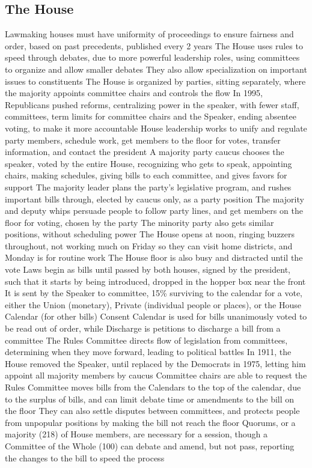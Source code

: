 \documentclass[11 pt, twoside]{article}
\newenvironment{outline*}
{
	\begin{outline}[enumerate]
	}
	{\end{outline}
}
\begin{document}
\subsection{The House}
\begin{outline*}
\1 Lawmaking houses must have uniformity of proceedings to ensure fairness and order, based on past precedents, published every 2 years
\1 The House uses rules to speed through debates, due to more powerful leadership roles, using committees to organize and allow smaller debates
\2 They also allow specialization on important issues to constituents
\2 The House is organized by parties, sitting separately, where the majority appoints committee chairs and controls the flow
\2 In 1995, Republicans pushed reforms, centralizing power in the speaker, with fewer staff, committees, term limits for committee chairs and the Speaker, ending absentee voting, to make it more accountable
\1 House leadership works to unify and regulate party members, schedule work, get members to the floor for votes, transfer information, and contact the president
\2 A majority party caucus chooses the speaker, voted by the entire House, recognizing who gets to speak, appointing chairs, making schedules, giving bills to each committee, and gives favors for support
\2 The majority leader plans the party's legislative program, and rushes important bills through, elected by caucus only, as a party position
\2 The majority and deputy whips persuade people to follow party lines, and get members on the floor for voting, chosen by the party
\2 The minority party also gets similar positions, without scheduling power
\1 The House opens at noon, ringing buzzers throughout, not working much on Friday so they can visit home districts, and Monday is for routine work
\2 The House floor is also busy and distracted until the vote
\1 Laws begin as bills until passed by both houses, signed by the president, such that it starts by being introduced, dropped in the hopper box near the front
\2 It is sent by the Speaker to committee, 15\% surviving to the calendar for a vote, either the Union (monetary), Private (individual people or places), or the House Calendar (for other bills)
\2 Consent Calendar is used for bills unanimously voted to be read out of order, while Discharge is petitions to discharge a bill from a committee
\1 The Rules Committee directs flow of legislation from committees, determining when they move forward, leading to political battles
\2 In 1911, the House removed the Speaker, until replaced by the Democrats in 1975, letting him appoint all majority members by caucus
\2 Committee chairs are able to request the Rules Committee moves bills from the Calendars to the top of the calendar, due to the surplus of bills, and can limit debate time or amendments to the bill on the floor
\2 They can also settle disputes between committees, and protects people from unpopular positions by making the bill not reach the floor
\1 Quorums, or a majority (218) of House members, are necessary for a session, though a Committee of the Whole (100) can debate and amend, but not pass, reporting the changes to the bill to speed the process
\end{outline*}
\end{document}
